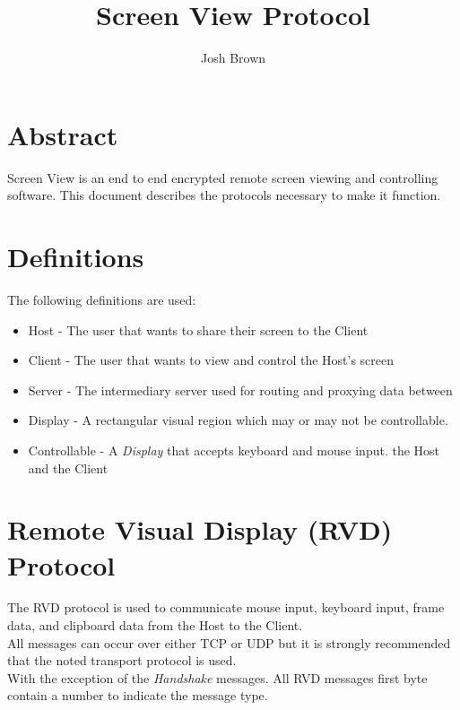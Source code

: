 \documentclass[11pt o]{article}
\title{Screen View Protocol}
\author{Josh Brown}
\newcommand{\projectName}{Screen View}
\begin{document}
    \maketitle
    \newpage
    \tableofcontents
    \newpage


    \section{Abstract}
    \projectName{} is an end to end encrypted remote screen viewing and controlling software. This document describes
    the protocols necessary to make it function.

    \newpage


    \section{Definitions}
    The following definitions are used:

    \begin{itemize}
        \item Host - The user that wants to share their screen to the Client
        \item Client - The user that wants to view and control the Host's screen
        \item Server - The intermediary server used for routing and proxying data between
        \item Display - A rectangular visual region which may or may not be controllable.
        \item Controllable - A \emph{Display} that accepts keyboard and mouse input.
        the Host and the Client
    \end{itemize}


    \section{Remote Visual Display (RVD) Protocol}

    The RVD protocol is used to communicate mouse input, keyboard input, frame data, and clipboard data from the Host to the Client.\\

    All messages can occur over either TCP or UDP but it is strongly recommended that the noted transport protocol is used.\\

    With the exception of the \emph{Handshake} messages. All RVD messages first byte contain a number to indicate the message type.
\end{document}
